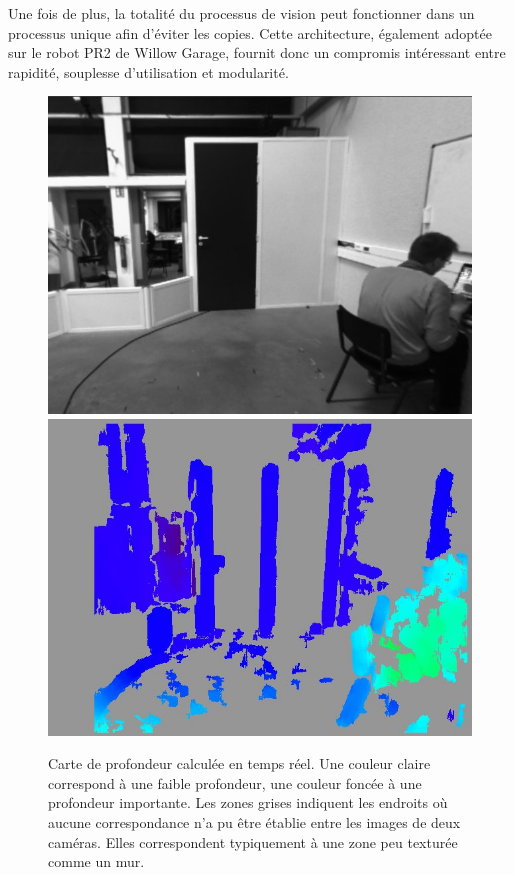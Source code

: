 Une fois de plus, la totalité du processus de vision peut fonctionner
dans un processus unique afin d'éviter les copies. Cette architecture,
également adoptée sur le robot PR2 de Willow
Garage, fournit donc un compromis intéressant entre rapidité,
souplesse d'utilisation et modularité.

\begin{figure}
  \begin{center}
    \includegraphics[width=.95\linewidth]{src/chap4-integration/disparity-1.jpg}
    \includegraphics[width=.95\linewidth]{src/chap4-integration/disparity-2.jpg}
  \end{center}
  \caption{Carte de profondeur calculée en
    temps réel. Une couleur claire correspond à une faible profondeur,
    une couleur foncée à une profondeur importante. Les zones grises
    indiquent les endroits où aucune correspondance n'a pu être
    établie entre les images de deux caméras. Elles correspondent
    typiquement à une zone peu texturée comme un mur.}
\end{figure}


